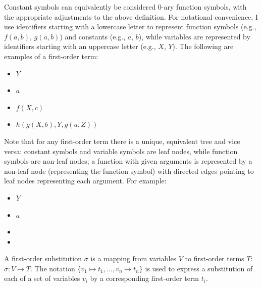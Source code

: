 Constant symbols can equivalently be considered 0-ary function symbols, with the appropriate adjustments to the above definition. For notational convenience, I use identifiers starting with a lowercase letter to represent function symbols (e.g., $f(a,b)$, $g(a,b)$) and constants (e.g., $a$, $b$), while variables are represented by identifiers starting with an uppercase letter (e.g., $X$, $Y$). The following are examples of a first-order term:
\begin{itemize} [leftmargin=0.7in]
\item $Y$
\item $a$
\item $f(X, c)$
\item $h(g(X, b),Y, g(a, Z))$
\end{itemize}
Note that for any first-order term there is a unique, equivalent tree and vice versa: constant symbols and variable symbols are leaf nodes, while function symbols are non-leaf nodes; a function with given arguments is represented by a non-leaf node (representing the function symbol) with directed edges pointing to leaf nodes representing each argument.  For example:
\begin{itemize} [leftmargin=0.7in]
\item $Y$
\item $a$
\item {}
\item {}
\end{itemize}

\begin{defn}\label{def:substitution}
A first-order substitution $\sigma$ is a mapping from variables $V$ to first-order terms $T$: $\sigma: V\mapsto T$. The notation $\{v_1 \mapsto t_1, \ldots, v_n \mapsto t_n\}$ is used to express a substitution of each of a set of variables $v_i$ by a corresponding first-order term $t_i$.
\end{defn}

